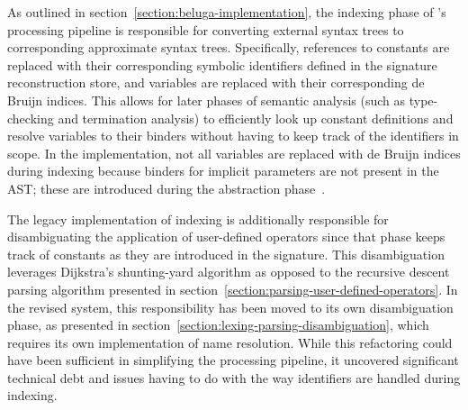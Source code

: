 As outlined in section~\ref{section:beluga-implementation}, the indexing phase of \Beluga's processing pipeline is responsible for converting external syntax trees to corresponding approximate syntax trees.
Specifically, references to constants are replaced with their corresponding symbolic identifiers defined in the signature reconstruction store, and variables are replaced with their corresponding de Bruijn indices.
This allows for later phases of semantic analysis (such as type-checking and termination analysis) to efficiently look up constant definitions and resolve variables to their binders without having to keep track of the identifiers in scope.
In the implementation, not all variables are replaced with de Bruijn indices during indexing because binders for implicit parameters are not present in the \ac{AST}; these are introduced during the abstraction phase~\cite{germain2010implementation}.



The legacy implementation of indexing is additionally responsible for disambiguating the application of user-defined operators since that phase keeps track of constants as they are introduced in the signature.
This disambiguation leverages Dijkstra's shunting-yard algorithm as opposed to the recursive descent parsing algorithm presented in section~\ref{section:parsing-user-defined-operators}.
In the revised system, this responsibility has been moved to its own disambiguation phase, as presented in section~\ref{section:lexing-parsing-disambiguation}, which requires its own implementation of name resolution.
While this refactoring could have been sufficient in simplifying the processing pipeline, it uncovered significant technical debt and issues having to do with the way identifiers are handled during indexing.

